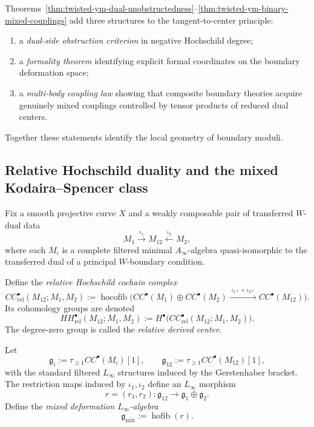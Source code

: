 \begin{remark}
\label{rem:twisted-ym-interaction-content}
Theorems~\ref{thm:twisted-ym-dual-unobstructedness}--\ref{thm:twisted-ym-binary-mixed-couplings}
add three structures to the tangent-to-center principle:
\begin{enumerate}[label=(\roman*)]
\item a \emph{dual-side obstruction criterion} in negative Hochschild degree;
\item a \emph{formality theorem} identifying explicit formal coordinates on the boundary deformation space;
\item a \emph{multi-body coupling law} showing that composite boundary theories acquire genuinely mixed couplings controlled by tensor products of reduced dual centers.
\end{enumerate}
Together these statements identify the local geometry of boundary moduli.
\end{remark}

\subsection{Relative Hochschild duality and the mixed Kodaira--Spencer class}
\label{subsec:relative-hochschild-mixed-ks}

Fix a smooth projective curve $X$ and a weakly composable pair of transferred $W$-dual data
\[
M_1 \xrightarrow{\iota_1} M_{12} \xleftarrow{\iota_2} M_2,
\]
where each $M_i$ is a complete filtered minimal $A_\infty$-algebra quasi-isomorphic to the transferred dual of a principal $W$-boundary condition.

\begin{definition}
\label{def:relative-hochschild-cochains}
Define the \emph{relative Hochschild cochain complex}
\[
CC^\bullet_{\mathrm{rel}}(M_{12};M_1,M_2)
:=
\operatorname{hocofib}\!\Big(
CC^\bullet(M_1)\oplus CC^\bullet(M_2)
\xrightarrow{\;\iota_{1*}+\iota_{2*}\;}
CC^\bullet(M_{12})
\Big).
\]
Its cohomology groups are denoted
\[
HH^\bullet_{\mathrm{rel}}(M_{12};M_1,M_2)
:= H^\bullet\big(CC^\bullet_{\mathrm{rel}}(M_{12};M_1,M_2)\big).
\]
The degree-zero group is called the \emph{relative derived center}.
\end{definition}

\begin{definition}
\label{def:mixed-deformation-linfty-relative}
Let
\[
\mathfrak g_i:=\tau_{\ge 1}CC^\bullet(M_i)[1],
\qquad
\mathfrak g_{12}:=\tau_{\ge 1}CC^\bullet(M_{12})[1],
\]
with the standard filtered $L_\infty$ structures induced by the Gerstenhaber bracket. The restriction maps induced by $\iota_1,\iota_2$ define an $L_\infty$ morphism
\[
r=(r_1,r_2):\mathfrak g_{12}\to \mathfrak g_1\oplus \mathfrak g_2.
\]
Define the \emph{mixed deformation $L_\infty$-algebra}
\[
\mathfrak g_{\mathrm{mix}}:=\operatorname{hofib}(r).
\]
\end{definition}

